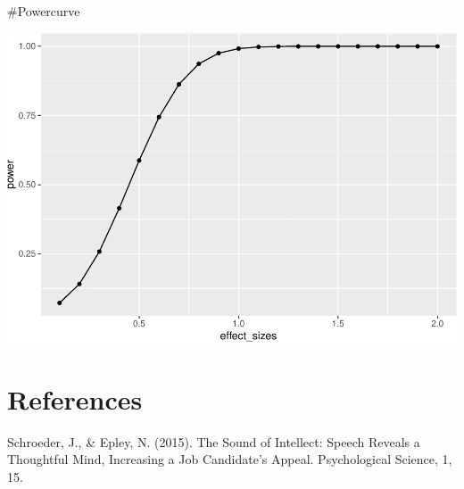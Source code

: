 \documentclass[
  english,
  man]{apa6}
\begin{document}
\#Powercurve

\includegraphics{CSF-semester-project_files/figure-latex/unnamed-chunk-6-1.pdf}

\newpage

\hypertarget{references}{%
\section{References}\label{references}}

Schroeder, J., \& Epley, N. (2015). The Sound of Intellect: Speech Reveals a Thoughtful Mind, Increasing a Job Candidate's Appeal. Psychological Science, 1, 15.

\begingroup
\setlength{\parindent}{-0.5in}
\setlength{\leftskip}{0.5in}
\end{document}
